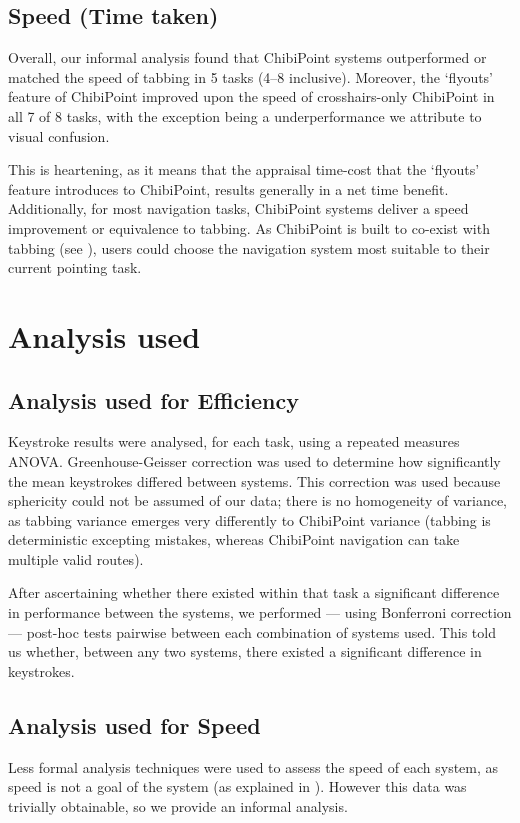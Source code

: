 \documentclass[11pt,openright,a4paper]{report}
\begin{document}
\subsection{Speed (Time taken)}
Overall, our informal analysis found that ChibiPoint systems outperformed or matched the speed of tabbing in 5 tasks (4--8 inclusive). Moreover, the `flyouts' feature of ChibiPoint improved upon the speed of crosshairs-only ChibiPoint in all 7 of 8 tasks, with the exception being a underperformance we attribute to visual confusion.

This is heartening, as it means that the appraisal time-cost that the `flyouts' feature introduces to ChibiPoint, results generally in a net time benefit. Additionally, for most navigation tasks, ChibiPoint systems deliver a speed improvement or equivalence to tabbing. As ChibiPoint is built to co-exist with tabbing (see ), users could choose the navigation system most suitable to their current pointing task.

\section{Analysis used}
\subsection{Analysis used for Efficiency}
Keystroke results were analysed, for each task, using a repeated measures ANOVA. Greenhouse-Geisser correction was used to determine how significantly the mean keystrokes differed between systems. This correction was used because sphericity could not be assumed of our data; there is no homogeneity of variance, as tabbing variance emerges very differently to ChibiPoint variance (tabbing is deterministic excepting mistakes, whereas ChibiPoint navigation can take multiple valid routes).

After ascertaining whether there existed within that task a significant difference in performance between the systems, we performed --- using Bonferroni correction --- post-hoc tests pairwise between each combination of systems used. This told us whether, between any two systems, there existed a significant difference in keystrokes.

\subsection{Analysis used for Speed}
Less formal analysis techniques were used to assess the speed of each system, as speed is not a goal of the system (as explained in ). However this data was trivially obtainable, so we provide an informal analysis.
\end{document}
